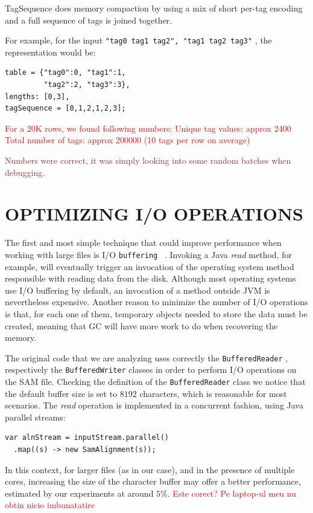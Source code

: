 \documentclass[a4paper,twoside]{article}
\begin{document}
TagSequence does memory compaction by using a mix of short per-tag encoding and a full sequence of tags is joined together.

For example, for the input {\texttt{"tag0 tag1 tag2", "tag1 tag2 tag3"} }, the representation would be:
\begin{verbatim}
table = {"tag0":0, "tag1":1, 
         "tag2":2, "tag3":3},
lengths: [0,3], 
tagSequence = [0,1,2,1,2,3]; 
\end{verbatim}

\textcolor{red}{
For a 20K rows, we found following numbers:
Unique tag values: approx 2400
Total number of tags: approx 200000 (10 tags per row on average)
}

\textcolor{brown}{ Numbers were correct, it was simply looking into some random batches when debugging.
}


\section{\uppercase{Optimizing I/O Operations}}\label{sec:uppercase3}

The first and most simple technique that could improve performance when working with large files
is I/O {\texttt{buffering} }~\cite{oaks:2014}.
Invoking a Java {\textit{read} } method, for example, will eventually trigger an invocation of the operating system method responsible with reading data from the disk.
Although most operating systems use I/O buffering by default, an invocation of a method outside JVM is nevertheless expensive.
Another reason to minimize the number of I/O operations is that, for each one of them, temporary objects needed to store the data must be created, meaning that GC will have more work to do when recovering the memory.

The original code that we are analyzing uses correctly the {\texttt{BufferedReader} }, respectively the {\texttt{BufferedWriter} } classes in order to perform I/O operations on the SAM file.
Checking the definition of the {\texttt{BufferedReader} } class we notice that the default buffer size is set to $8192$ characters, which is reasonable for most scenarios.
The {\textit{read} } operation is implemented in a concurrent fashion, using Java parallel streams:
\begin{verbatim}
var alnStream = inputStream.parallel()
  .map((s) -> new SamAlignment(s));
\end{verbatim}
In this context, for larger files (as in our case), and in the presence of multiple cores, increasing the size of the character buffer may offer a better performance, estimated by our experiments at around $5\%$. \textcolor{red}{Este corect?
Pe laptop-ul meu nu obtin nicio imbunatatire}
\end{document}
